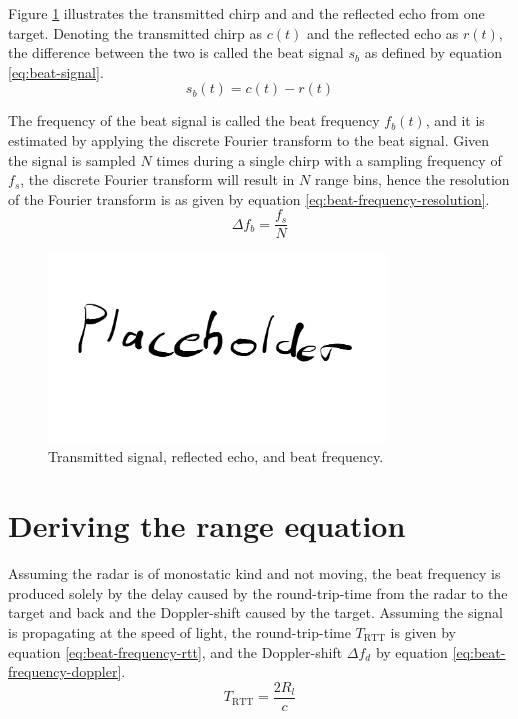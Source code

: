 Figure \ref{fig:beat-frequency} illustrates the transmitted chirp and and the reflected echo
from one target. Denoting the transmitted chirp as $c(t)$ and the reflected echo as $r(t)$,
the difference between the two is called the beat signal $s_{b}$ as defined by
equation \ref{eq:beat-signal}.
\begin{equation}
    \label{eq:beat-signal}
    s_{b}(t) = c(t) - r(t)
\end{equation}

The frequency of the beat signal is called the beat frequency $f_{b}(t)$,
and it is estimated by applying the discrete Fourier transform to the beat signal.
Given the signal is sampled $N$ times during a single chirp with a sampling frequency of $f_{s}$,
the discrete Fourier transform will result in $N$ range bins,
hence the resolution of the Fourier transform is as given by equation \ref{eq:beat-frequency-resolution}.
\begin{equation}
    \label{eq:beat-frequency-resolution}
    \Delta f_{b} = \frac{f_{s}}{N}
\end{equation}

\begin{figure}
    \centering
    \includegraphics[width=0.8\textwidth]{fig/placeholder.png}
    \caption{Transmitted signal, reflected echo, and beat frequency.}
    \label{fig:beat-frequency}
\end{figure}

\section{Deriving the range equation}
Assuming the radar is of monostatic kind and not moving,
the beat frequency is produced solely by the delay caused by the round-trip-time from the radar to the target and back
and the Doppler-shift caused by the target.
Assuming the signal is propagating at the speed of light, the round-trip-time $T_{\mathrm{RTT}}$ is given by equation \ref{eq:beat-frequency-rtt},
and the Doppler-shift $\Delta f_{d}$ by equation \ref{eq:beat-frequency-doppler}.
\begin{equation}
    \label{eq:beat-frequency-rtt}
    T_{\mathrm{RTT}} = \frac{2R_{l}}{c}
\end{equation}

